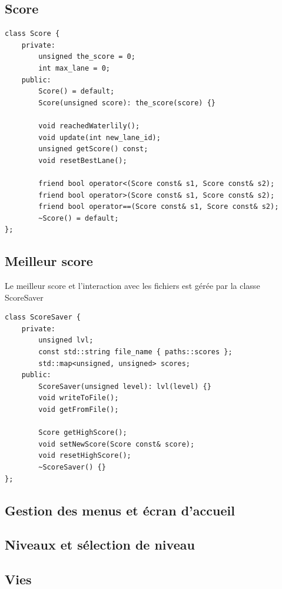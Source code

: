 \documentclass[a4paper, 12pt]{article}
\begin{document}
\subsection{Score}
\begin{lstlisting}
class Score {
    private:
        unsigned the_score = 0;
        int max_lane = 0;
    public:
        Score() = default;
        Score(unsigned score): the_score(score) {}

        void reachedWaterlily();
        void update(int new_lane_id);
        unsigned getScore() const;
        void resetBestLane();

        friend bool operator<(Score const& s1, Score const& s2);
        friend bool operator>(Score const& s1, Score const& s2);
        friend bool operator==(Score const& s1, Score const& s2);
        ~Score() = default;
};
\end{lstlisting}
\subsection{Meilleur score}
Le meilleur score et l'interaction avec les fichiers est gérée par la classe ScoreSaver
\begin{lstlisting}
class ScoreSaver {
    private:
        unsigned lvl;
        const std::string file_name { paths::scores };
        std::map<unsigned, unsigned> scores;
    public:
        ScoreSaver(unsigned level): lvl(level) {}
        void writeToFile();
        void getFromFile();

        Score getHighScore();
        void setNewScore(Score const& score);
        void resetHighScore();
        ~ScoreSaver() {}
};
\end{lstlisting}
\subsection{Gestion des menus et écran d'accueil}

\subsection{Niveaux et sélection de niveau}

\subsection{Vies}
\end{document}
